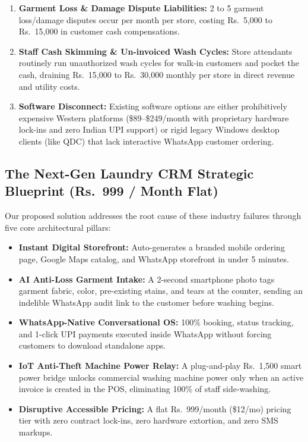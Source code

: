 \documentclass[11pt,a4paper]{article}
\begin{document}
\begin{enumerate}[leftmargin=*]
    \item \textbf{Garment Loss \& Damage Dispute Liabilities:} 2 to 5 garment loss/damage disputes occur per month per store, costing Rs.~5,000 to Rs.~15,000 in customer cash compensations.
    \item \textbf{Staff Cash Skimming \& Un-invoiced Wash Cycles:} Store attendants routinely run unauthorized wash cycles for walk-in customers and pocket the cash, draining Rs.~15,000 to Rs.~30,000 monthly per store in direct revenue and utility costs.
    \item \textbf{Software Disconnect:} Existing software options are either prohibitively expensive Western platforms (\$89--\$249/month with proprietary hardware lock-ins and zero Indian UPI support) or rigid legacy Windows desktop clients (like QDC) that lack interactive WhatsApp customer ordering.
\end{enumerate}

\subsection{The Next-Gen Laundry CRM Strategic Blueprint (Rs.~999 / Month Flat)}

Our proposed solution addresses the root cause of these industry failures through five core architectural pillars:
\begin{itemize}[leftmargin=*]
    \item \textbf{Instant Digital Storefront:} Auto-generates a branded mobile ordering page, Google Maps catalog, and WhatsApp storefront in under 5 minutes.
    \item \textbf{AI Anti-Loss Garment Intake:} A 2-second smartphone photo tags garment fabric, color, pre-existing stains, and tears at the counter, sending an indelible WhatsApp audit link to the customer before washing begins.
    \item \textbf{WhatsApp-Native Conversational OS:} 100\% booking, status tracking, and 1-click UPI payments executed inside WhatsApp without forcing customers to download standalone apps.
    \item \textbf{IoT Anti-Theft Machine Power Relay:} A plug-and-play Rs.~1,500 smart power bridge unlocks commercial washing machine power only when an active invoice is created in the POS, eliminating 100\% of staff side-washing.
    \item \textbf{Disruptive Accessible Pricing:} A flat Rs.~999/month (\$12/mo) pricing tier with zero contract lock-ins, zero hardware extortion, and zero SMS markups.
\end{itemize}
\end{document}
